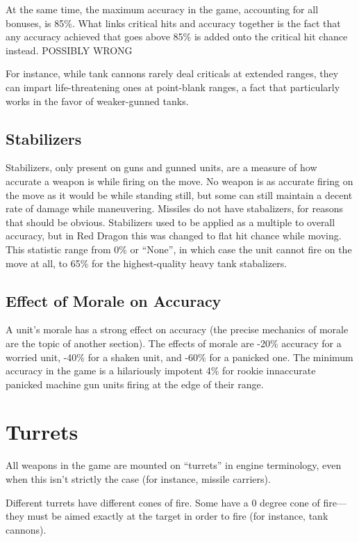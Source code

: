 \documentclass{article}
\begin{document}
At the same time, the maximum accuracy in the game, accounting for all bonuses,
is 85\%. What links critical hits and accuracy together is the fact that any
accuracy achieved that goes above 85\% is added onto the critical hit chance
instead. POSSIBLY WRONG

For instance, while tank cannons rarely deal criticals at extended ranges, they
can impart life-threatening ones at point-blank ranges, a fact that
particularly works in the favor of weaker-gunned tanks.

\subsection{Stabilizers}

Stabilizers, only present on guns and gunned units, are a measure of how
accurate a weapon is while firing on the move. No weapon is as accurate firing
on the move as it would be while standing still, but some can still maintain a
decent rate of damage while maneuvering. Missiles do not have stabalizers, for
reasons that should be obvious. Stabilizers used to be applied as a multiple to
overall accuracy, but in Red Dragon this was changed to flat hit chance while
moving. This statistic range from 0\% or ``None'', in which case the unit cannot
fire on the move at all, to 65\% for the highest-quality heavy tank stabalizers.

\subsection{Effect of Morale on Accuracy}

A unit's morale has a strong effect on accuracy (the precise mechanics of
morale are the topic of another section). The effects of morale are -20\%
accuracy for a worried unit, -40\% for a shaken unit, and -60\% for a panicked
one. The minimum accuracy in the game is a hilariously impotent 4\% for
rookie innaccurate panicked machine gun units firing at the edge of their range.

\section{Turrets}

All weapons in the game are mounted on ``turrets'' in engine terminology, even
when this isn't strictly the case (for instance, missile carriers).

Different turrets have different cones of fire. Some have a 0 degree cone of
fire---they must be aimed exactly at the target in order to fire (for instance,
tank cannons).
\end{document}
